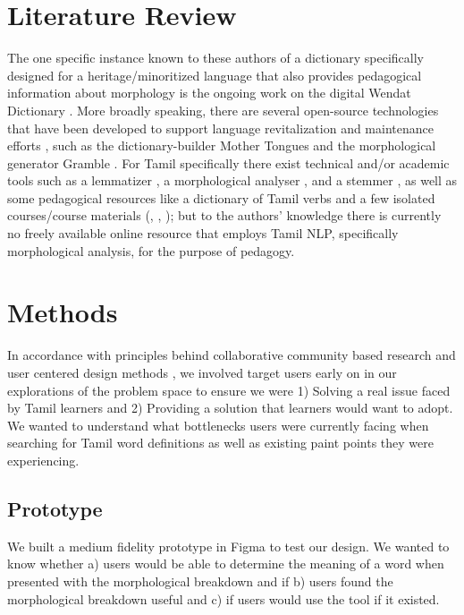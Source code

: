 \documentclass[11pt]{article}
\begin{document}
\section{Literature Review}
The one specific instance known to these authors of a dictionary specifically designed for a heritage/minoritized 
language that also provides pedagogical information about morphology is the ongoing work on the 
digital Wendat Dictionary \citep{lukaniec_modern_2023}. 
More broadly speaking, there are several open-source technologies that have been developed to 
support language revitalization and maintenance efforts \citep{brinklow_indigenous_nodate}, 
such as the dictionary-builder Mother Tongues \citep{littell_waldayu_2017} and the 
morphological generator Gramble \citep{littell_gramble_2024}. 
For Tamil specifically there exist technical and/or academic tools such as a lemmatizer \citep{qi2020stanza}, 
a morphological analyser \citep{sarveswaran_thamizhimorph_2021},  and a stemmer \citep{rajalingam_rdamodharantamil-stemmer_2025}, as well as some 
pedagogical resources like a dictionary of Tamil verbs \citep{schiffman_english_2009} and a few 
isolated courses/course materials (\citealp{annamalai_colloquial_2002}, \citealp{prasad_tamil_2025}, \citealp{cheran_learn_2001}); 
but to the authors’ knowledge there is currently no freely available online resource that employs Tamil NLP, 
specifically morphological analysis, for the purpose of pedagogy.

\section{Methods}
In accordance with principles behind collaborative community based research \citep{bucholtz_community-centered_2021} and user centered design methods \citep{wallisch_overcoming_2019}, 
we involved target users early on in our explorations of the problem space to ensure we were 1) Solving a real issue faced by Tamil learners and 2) Providing a solution that learners would want to adopt. 
We wanted to understand what bottlenecks users were currently facing when searching for Tamil word definitions as well as existing paint points they were experiencing. 

\subsection{Prototype}
We built a medium fidelity prototype in Figma to test our design. 
We wanted to know whether a) users would be able to determine the meaning 
of a word when presented with the morphological breakdown and if 
b) users found the morphological breakdown useful and 
c) if users would use the tool if it existed.
\end{document}
